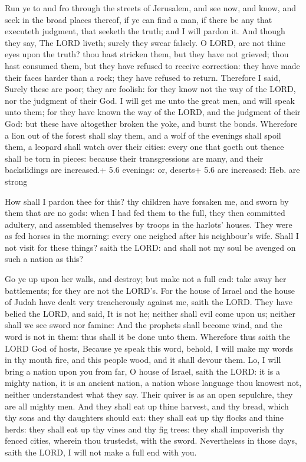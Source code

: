  Run ye to and fro through the streets of Jerusalem, and see
now, and know, and seek in the broad places thereof, if ye can find a
man, if there be any that executeth judgment, that seeketh the truth;
and I will pardon it.  And though they say, The LORD liveth;
surely they swear falsely.  O LORD, are not thine eyes upon
the truth? thou hast stricken them, but they have not grieved; thou hast
consumed them, but they have refused to receive correction: they have
made their faces harder than a rock; they have refused to return.
 Therefore I said, Surely these are poor; they are foolish:
for they know not the way of the LORD, nor the judgment of their God.
 I will get me unto the great men, and will speak unto them;
for they have known the way of the LORD, and the judgment of their God:
but these have altogether broken the yoke, and burst the bonds.
 Wherefore a lion out of the forest shall slay them, and a
wolf of the evenings shall spoil them, a leopard shall watch over their
cities: every one that goeth out thence shall be torn in pieces: because
their transgressions are many, and their backslidings are increased.+
5.6 evenings: or, deserts+ 5.6 are increased: Heb. are strong

 How shall I pardon thee for this? thy children have
forsaken me, and sworn by them that are no gods: when I had fed them to
the full, they then committed adultery, and assembled themselves by
troops in the harlots' houses.  They were as fed horses in
the morning: every one neighed after his neighbour's wife. 
Shall I not visit for these things? saith the LORD: and shall not my
soul be avenged on such a nation as this?

 Go ye up upon her walls, and destroy; but make not a
full end: take away her battlements; for they are not the LORD's.
 For the house of Israel and the house of Judah have dealt
very treacherously against me, saith the LORD.  They have
belied the LORD, and said, It is not he; neither shall evil come upon
us; neither shall we see sword nor famine:  And the
prophets shall become wind, and the word is not in them: thus shall it
be done unto them.  Wherefore thus saith the LORD God of
hosts, Because ye speak this word, behold, I will make my words in thy
mouth fire, and this people wood, and it shall devour them.
 Lo, I will bring a nation upon you from far, O house of
Israel, saith the LORD: it is a mighty nation, it is an ancient nation,
a nation whose language thou knowest not, neither understandest what
they say.  Their quiver is as an open sepulchre, they are
all mighty men.  And they shall eat up thine harvest, and
thy bread, which thy sons and thy daughters should eat: they shall eat
up thy flocks and thine herds: they shall eat up thy vines and thy fig
trees: they shall impoverish thy fenced cities, wherein thou trustedst,
with the sword.  Nevertheless in those days, saith the
LORD, I will not make a full end with you.

